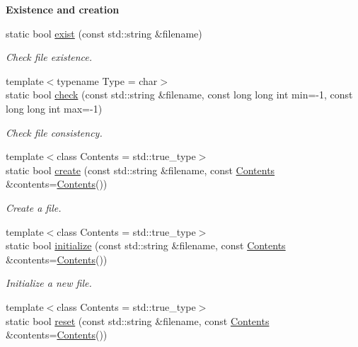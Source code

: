 \begin{Indent}{\bf Existence and creation}\par
\begin{DoxyCompactItemize}
\item 
static bool \hyperlink{exceptionmagrathea_1_1FileSystem_ae75b7fb73e1a1c2cf21fad6da443fc9e}{exist} (const std\-::string \&filename)
\begin{DoxyCompactList}\small\item\em Check file existence. \end{DoxyCompactList}\item 
{\footnotesize template$<$typename Type  = char$>$ }\\static bool \hyperlink{exceptionmagrathea_1_1FileSystem_aab0114471f9d98afd6e524b3dcf6ab4e}{check} (const std\-::string \&filename, const long long int min=-\/1, const long long int max=-\/1)
\begin{DoxyCompactList}\small\item\em Check file consistency. \end{DoxyCompactList}\item 
{\footnotesize template$<$class Contents  = std\-::true\-\_\-type$>$ }\\static bool \hyperlink{exceptionmagrathea_1_1FileSystem_a03b9ba26d56d0d899b3b81521a54c9c2}{create} (const std\-::string \&filename, const \hyperlink{exceptionmagrathea_1_1Contents}{Contents} \&contents=\hyperlink{exceptionmagrathea_1_1Contents}{Contents}())
\begin{DoxyCompactList}\small\item\em Create a file. \end{DoxyCompactList}\item 
{\footnotesize template$<$class Contents  = std\-::true\-\_\-type$>$ }\\static bool \hyperlink{exceptionmagrathea_1_1FileSystem_a1404089cc3cdb33aa4037db8a22448fc}{initialize} (const std\-::string \&filename, const \hyperlink{exceptionmagrathea_1_1Contents}{Contents} \&contents=\hyperlink{exceptionmagrathea_1_1Contents}{Contents}())
\begin{DoxyCompactList}\small\item\em Initialize a new file. \end{DoxyCompactList}\item 
{\footnotesize template$<$class Contents  = std\-::true\-\_\-type$>$ }\\static bool \hyperlink{exceptionmagrathea_1_1FileSystem_a65e3c1fa21f46bf45f17dde1ed900fac}{reset} (const std\-::string \&filename, const \hyperlink{exceptionmagrathea_1_1Contents}{Contents} \&contents=\hyperlink{exceptionmagrathea_1_1Contents}{Contents}())

\end{DoxyCompactItemize}
\end{Indent}
